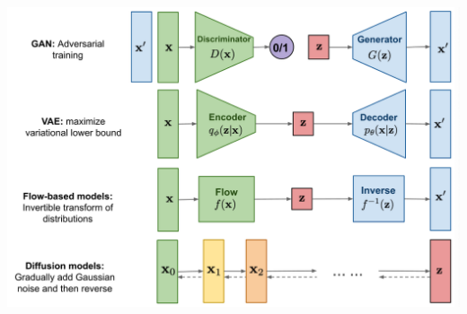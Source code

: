 \begin{Figure}
 		\centering
 		\includegraphics[width=\linewidth]{graphic/gen-overview}
\end{Figure}

